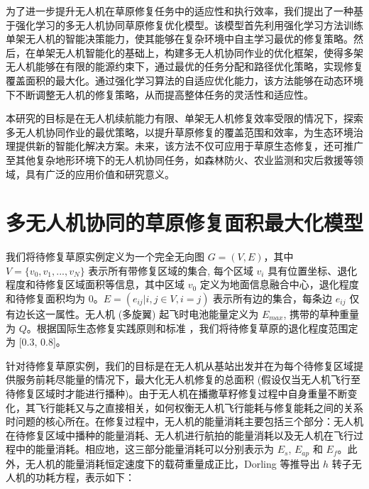 \documentclass[AutoFakeBold]{LZUThesis}
\begin{document}
为了进一步提升无人机在草原修复任务中的适应性和执行效率，我们提出了一种基于强化学习的多无人机协同草原修复优化模型。该模型首先利用强化学习方法训练单架无人机的智能决策能力，使其能够在复杂环境中自主学习最优的修复策略。然后，在单架无人机智能化的基础上，构建多无人机协同作业的优化框架，使得多架无人机能够在有限的能源约束下，通过最优的任务分配和路径优化策略，实现修复覆盖面积的最大化。通过强化学习算法的自适应优化能力，该方法能够在动态环境下不断调整无人机的修复策略，从而提高整体任务的灵活性和适应性。

本研究的目标是在无人机续航能力有限、单架无人机修复效率受限的情况下，探索多无人机协同作业的最优策略，以提升草原修复的覆盖范围和效率，为生态环境治理提供新的智能化解决方案。未来，该方法不仅可应用于草原生态修复，还可推广至其他复杂地形环境下的无人机协同任务，如森林防火、农业监测和灾后救援等领域，具有广泛的应用价值和研究意义。




\mainmatter

\chapter{多无人机协同的草原修复面积最大化模型}

我们将待修复草原实例定义为一个完全无向图 $G = (V, E)$，其中 $V = \{v_0, v_1, ..., v_N \}$ 表示所有带修复区域的集合, 每个区域 $v_i$ 具有位置坐标、退化程度和待修复区域面积等信息，其中区域 $v_0$ 定义为地面信息融合中心，退化程度和待修复面积均为 0。$E = (e_{ij} |i, j \in V, i = j)$ 表示所有边的集合，每条边 $e_{ij}$ 仅有边长这一属性。无人机 (多旋翼) 起飞时电池能量定义为 $E_{max}$, 携带的草种重量为 $Q$。根据国际生态修复实践原则和标准\cite{gann2019international} ，我们将待修复草原的退化程度范围定为 [0.3, 0.8]。

针对待修复草原实例，我们的目标是在无人机从基站出发并在为每个待修复区域提供服务前耗尽能量的情况下，最大化无人机修复的总面积 (假设仅当无人机飞行至待修复区域时才能进行播种)。由于无人机在播撒草籽修复过程中自身重量不断变化，其飞行能耗又与之直接相关，如何权衡无人机飞行能耗与修复能耗之间的关系时问题的核心所在。在修复过程中，无人机的能量消耗主要包括三个部分：无人机在待修复区域中播种的能量消耗、无人机进行航拍的能量消耗以及无人机在飞行过程中的能量消耗。相应地，这三部分能量消耗可以分别表示为 $E_s$, $E_{ap}$ 和 $E_f$。此外，无人机的能量消耗恒定速度下的载荷重量成正比，Dorling\cite{dorling2016vehicle} 等推导出 $h$ 转子无人机的功耗方程，表示如下：
\end{document}
